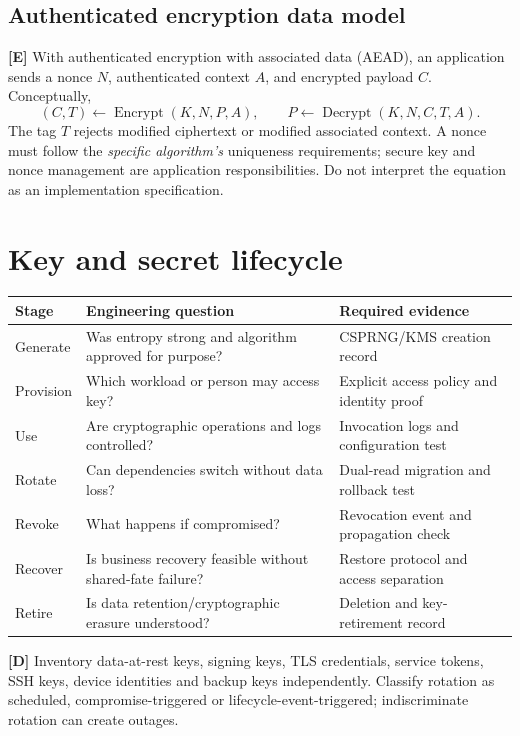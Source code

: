 \documentclass[10pt,letterpaper,oneside]{article}
\newcommand{\modernext}{\textsf{\color{muted}\textbf{[E]}}}
\newcommand{\designed}{\textsf{\color{accent}\textbf{[D]}}}
\begin{document}
\subsection{Authenticated encryption data model}\modernext{}
With authenticated encryption with associated data (AEAD), an application sends a nonce \(N\), authenticated context \(A\), and encrypted payload \(C\). Conceptually,
\[ (C,T)\gets\operatorname{Encrypt}(K,N,P,A),\qquad P\gets\operatorname{Decrypt}(K,N,C,T,A). \]
The tag \(T\) rejects modified ciphertext or modified associated context. A nonce must follow the \emph{specific algorithm's} uniqueness requirements; secure key and nonce management are application responsibilities. Do not interpret the equation as an implementation specification.

\section{Key and secret lifecycle}
\par\medskip\noindent\begin{longtable}{@{}p{}p{}p{}@{}}\toprule
Stage & Engineering question & Required evidence \\ \midrule\endhead
Generate & Was entropy strong and algorithm approved for purpose? & CSPRNG/KMS creation record\\
Provision & Which workload or person may access key? & Explicit access policy and identity proof\\
Use & Are cryptographic operations and logs controlled? & Invocation logs and configuration test\\
Rotate & Can dependencies switch without data loss? & Dual-read migration and rollback test\\
Revoke & What happens if compromised? & Revocation event and propagation check\\
Recover & Is business recovery feasible without shared-fate failure? & Restore protocol and access separation\\
Retire & Is data retention/cryptographic erasure understood? & Deletion and key-retirement record\\
\bottomrule\end{longtable}\par\medskip
\designed{} Inventory data-at-rest keys, signing keys, TLS credentials, service tokens, SSH keys, device identities and backup keys independently. Classify rotation as scheduled, compromise-triggered or lifecycle-event-triggered; indiscriminate rotation can create outages.
\end{document}

